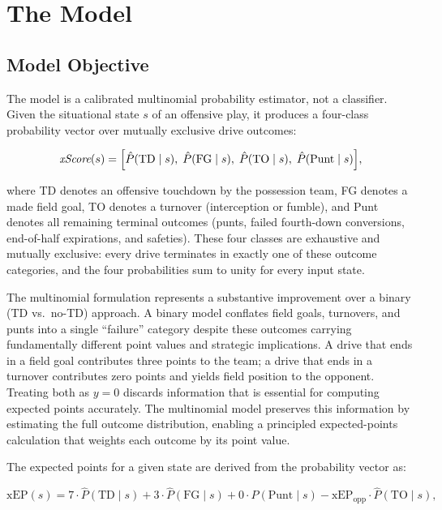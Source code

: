 \section{The \xscore{} Model}
\label{sec:xscore}

\subsection{Model Objective}

The \xscore{} model is a calibrated multinomial probability estimator, not a
classifier. Given the situational state $s$ of an offensive play, it produces
a four-class probability vector over mutually exclusive drive outcomes:

\begin{equation}
  \textit{xScore}(s) = \Bigl[\hat{P}(\text{TD} \mid s),\;
                      \hat{P}(\text{FG} \mid s),\;
                      \hat{P}(\text{TO} \mid s),\;
                      \hat{P}(\text{Punt} \mid s)\Bigr],
\end{equation}

where TD denotes an offensive touchdown by the possession team, FG denotes a
made field goal, TO denotes a turnover (interception or fumble), and Punt
denotes all remaining terminal outcomes (punts, failed fourth-down conversions,
end-of-half expirations, and safeties). These four classes are exhaustive and
mutually exclusive: every drive terminates in exactly one of these outcome
categories, and the four probabilities sum to unity for every input state.

The multinomial formulation represents a substantive improvement over a binary
(TD vs.\ no-TD) approach. A binary model conflates field goals, turnovers, and
punts into a single ``failure'' category despite these outcomes carrying
fundamentally different point values and strategic implications. A drive that
ends in a field goal contributes three points to the team; a drive that ends in
a turnover contributes zero points and yields field position to the opponent.
Treating both as $y = 0$ discards information that is essential for computing
expected points accurately. The multinomial model preserves this information by
estimating the full outcome distribution, enabling a principled expected-points
calculation that weights each outcome by its point value.

The expected points for a given state are derived from the probability vector as:

\begin{equation}
  \label{eq:xep}
  \mathrm{xEP}(s) = 7 \cdot \hat{P}(\text{TD} \mid s)
                   + 3 \cdot \hat{P}(\text{FG} \mid s)
                   + 0 \cdot \hat{P}(\text{Punt} \mid s)
                   - \mathrm{xEP}_{\mathrm{opp}} \cdot \hat{P}(\text{TO} \mid s),
\end{equation}

